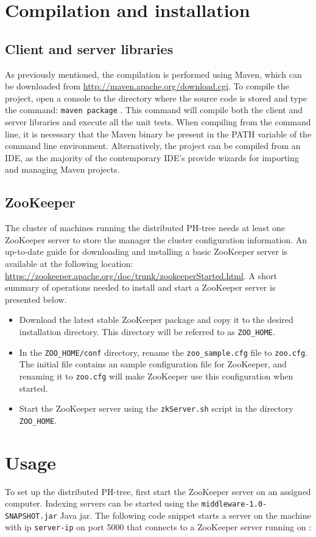 \documentclass[11pt,a4paper]{globis-book}
\begin{document}
\section{Compilation and installation} 

\subsection{Client and server libraries}
As previously mentioned, the compilation is performed using Maven, which can be downloaded from \url{http://maven.apache.org/download.cgi}. To compile the project, open a console to the directory where the source code is stored and type the command: \texttt{maven package} . This command will compile both the client and server libraries and execute all the unit tests. When compiling from the command line, it is necessary that the Maven binary be present in the PATH variable of the command line environment. Alternatively, the project can be compiled from an IDE, as the majority of the contemporary IDE's provide wizards for importing and managing Maven projects.

\subsection{ZooKeeper}
The cluster of machines running the distributed PH-tree needs at least one ZooKeeper server to store the manager the cluster configuration information. An up-to-date guide for downloading and installing a basic ZooKeeper server is available at the following location: \url{https://zookeeper.apache.org/doc/trunk/zookeeperStarted.html}. 
A short summary of operations needed to install and start a ZooKeeper server is presented below.
\begin{itemize}
    \item Download the latest stable ZooKeeper package and copy it to the desired installation directory. This directory will be referred to as \texttt{ZOO\_HOME}.
    \item In the \texttt{ZOO\_HOME/conf} directory, rename the \texttt{zoo\_sample.cfg} file to \texttt{zoo.cfg}. The initial file contains an sample configuration file for ZooKeeper, and renaming it to \texttt{zoo.cfg} will make ZooKeeper use this configuration when started.
    \item Start the ZooKeeper server using the \texttt{zkServer.sh} script in the directory \texttt{ZOO\_HOME}.
\end{itemize}

\section{Usage}
To set up the distributed PH-tree, first start the ZooKeeper server on an assigned computer. Indexing servers can be started using the \texttt{middleware-1.0-SNAPSHOT.jar} Java jar.
The following code snippet starts a server on the machine with ip \texttt{server-ip} on port 5000 that connects to a ZooKeeper server running on  : 
\end{document}
